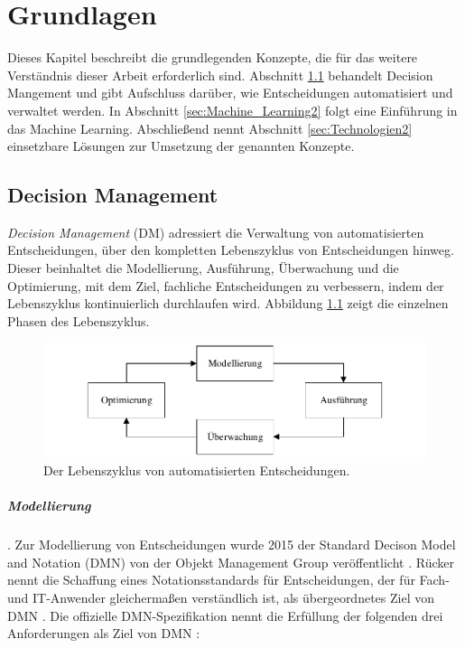 \chapter{Grundlagen}
\label{ch:Grundlagen2}

Dieses Kapitel beschreibt die grundlegenden Konzepte, die für das weitere Verständnis dieser Arbeit erforderlich sind. Abschnitt \ref{sec:Decision_Management2} behandelt Decision Mangement und gibt Aufschluss darüber, wie Entscheidungen automatisiert und verwaltet werden. In Abschnitt  \ref{sec:Machine_Learning2} folgt eine Einführung in das Machine Learning. Abschließend nennt Abschnitt \ref{sec:Technologien2} einsetzbare Lösungen zur Umsetzung der genannten Konzepte. 

\section{Decision Management}
\label{sec:Decision_Management2}

\emph{Decision Management} (DM) adressiert die Verwaltung von automatisierten Entscheidungen, über den kompletten Lebenszyklus von Entscheidungen hinweg. Dieser beinhaltet die Modellierung, Ausführung, Überwachung und die Optimierung, mit dem Ziel, fachliche Entscheidungen zu verbessern, indem der Lebenszyklus kontinuierlich durchlaufen wird. Abbildung \ref{fig:lifecycle} zeigt die einzelnen Phasen des Lebenszyklus.

\begin{figure}[ht]
\centering
\includegraphics{images/lifecycle.pdf}
\caption{Der Lebenszyklus von automatisierten Entscheidungen.}
\label{fig:lifecycle}
\end{figure}

\paragraph{Modellierung}. Zur Modellierung von Entscheidungen wurde 2015 der Standard Decison Model and Notation (DMN) von der Objekt Management Group veröffentlicht \cite[vgl. S. 7 ff.]{OM16}. Rücker nennt die Schaffung eines Notationsstandards für Entscheidungen, der für Fach- und IT-Anwender gleichermaßen verständlich ist, als übergeordnetes Ziel von DMN \cite[vgl. S. 40]{BR16}.  Die offizielle DMN-Spezifikation nennt die Erfüllung der folgenden drei Anforderungen als Ziel von DMN \cite[vgl. S. 18 ff.]{OM16}: 

